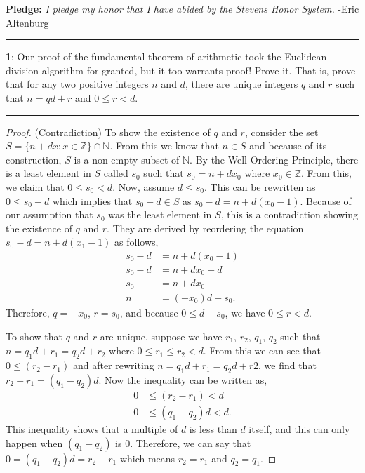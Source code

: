 \documentclass[11pt]{article}
\newcommand\question[2]{\vspace{.25in}\hrule\textbf{#1}: #2\vspace{.5em}\hrule\vspace{.10in}}
\newcommand{\N}{\mathbb{N}}
\newcommand{\Z}{\mathbb{Z}}
\begin{document}
\raggedright
\newcommand\NAME{Eric Altenburg}  %
\newcommand\COURSE{MA-240}
\newcommand\HWNUM{8}              %


\textbf{Pledge:} \textit{I pledge my honor that I have abided by the Stevens Honor System.} -Eric Altenburg

\question{1}{Our proof of the fundamental theorem of arithmetic took the Euclidean division algorithm for granted, but it too warrants proof! Prove it. That is, prove that for any two positive integers $n$ and $d$, there are unique integers $q$ and $r$ such that $n=qd+r$ and $0 \le r < d$.}

\begin{proof}
	(Contradiction) To show the existence of $q$ and $r$, consider the set $S=\{n+dx : x \in \Z\} \cap \N$. From this we know that $n \in S$ and because of its construction, $S$ is a non-empty subset of $\N$. By the Well-Ordering Principle, there is a least element in $S$ called $s_0$ such that $s_0 = n+dx_0$ where $x_0 \in \Z$. From this, we claim that $0 \le s_0 < d$. Now, assume $d \le s_0$. This can be rewritten as $0 \le s_0 -d$ which implies that $s_0-d \in S$ as $s_0-d = n+d(x_0-1)$. Because of our assumption that $s_0$ was the least element in $S$, this is a contradiction showing the existence of $q$ and $r$. They are derived by reordering the equation $s_0-d=n+d(x_1-1)$ as follows,
	\begin{align*}
	 	s_0-d&=n+d(x_0-1)\\
	 	s_0-d&=n+dx_0-d\\
	 	s_0&=n+dx_0\\
	 	n &= (-x_0)d + s_0.
 	\end{align*} 
	Therefore, $q = -x_0$, $r=s_0$, and because $0\le d-s_0$, we have $0 \le r < d$.

	To show that $q$ and $r$ are unique, suppose we have $r_1$, $r_2$, $q_1$, $q_2$ such that $n = q_1d+r_1 = q_2d+r_2$ where $0 \le r_1 \le r_2 < d$. From this we can see that $0 \le (r_2 - r_1)$ and after rewriting $n = q_1d+r_1 = q_2d+r2$, we find that $r_2-r_1 = (q_1-q_2)d$. Now the inequality can be written as,
	\begin{align*}
		0 &\le (r_2-r_1) < d\\
		0 &\le (q_1-q_2)d < d.
	\end{align*}
	This inequality shows that a multiple of $d$ is less than $d$ itself, and this can only happen when $(q_1-q_2)$ is 0. Therefore, we can say that $0 = (q_1-q_2)d = r_2-r_1$ which means $r_2 = r_1$ and $q_2 = q_1$.
\end{proof}
\end{document}
